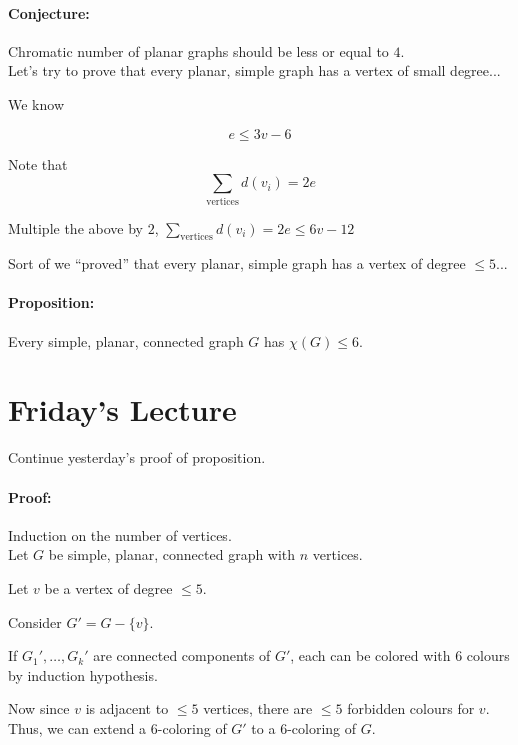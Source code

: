 \documentclass[a4paper, 11pt, twoside]{article}
\begin{document}
\paragraph{Conjecture:} Chromatic number of planar graphs should be less or equal to $4$.\\

Let's try to prove that every planar, simple graph has a vertex of small degree...

We know 

\[e\leq 3v-6\]

Note that \[\sum_{\text{vertices}}d(v_i)=2e\]

Multiple the above by $2$, $\sum_{\text{vertices}}d(v_i)=2e\leq 6v -12$

Sort of we ``proved'' that every planar, simple graph has a vertex of degree $\leq 5$...\\

\paragraph{Proposition:} Every simple, planar, connected graph $G$ has $\chi(G)\leq 6.$

\section{Friday's Lecture}

Continue yesterday's proof of proposition.

\paragraph{Proof:} Induction on the number of vertices.\\

Let $G$ be simple, planar, connected graph  with $n$ vertices.

Let $v$ be a vertex of degree $\leq 5$.

Consider $G'=G-\{v\}$.

If $G_1',\dots, G_k'$ are connected components of $G'$, each can be colored with $6$ colours by induction hypothesis.

Now since $v$ is adjacent to $\leq 5$ vertices, there are $\leq 5$ forbidden colours for $v$. Thus, we can extend a $6$-coloring of $G'$ to  a $6$-coloring of $G$.
\end{document}
